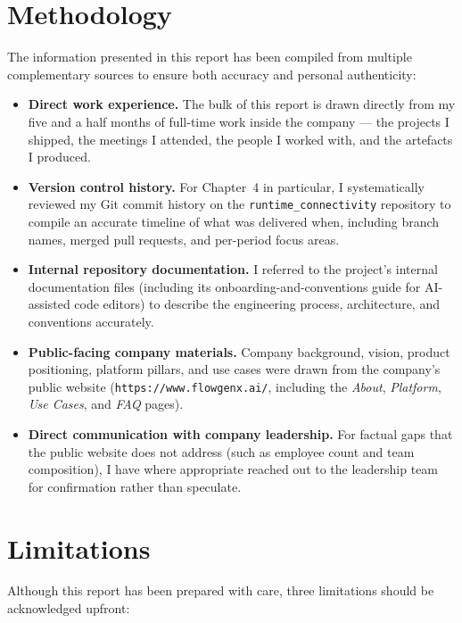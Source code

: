 \section{Methodology}
The information presented in this report has been compiled from
multiple complementary sources to ensure both accuracy and personal
authenticity:

\begin{itemize}[leftmargin=*]
    \item \textbf{Direct work experience.} The bulk of this report is
    drawn directly from my five and a half months of full-time work
    inside the company --- the projects I shipped, the meetings I
    attended, the people I worked with, and the artefacts I produced.

    \item \textbf{Version control history.} For Chapter~4 in particular,
    I systematically reviewed my Git commit history on the
    \texttt{runtime\_connectivity} repository to compile an accurate
    timeline of what was delivered when, including branch names,
    merged pull requests, and per-period focus areas.

    \item \textbf{Internal repository documentation.} I referred to the
    project's internal documentation files (including its
    onboarding-and-conventions guide for
    AI-assisted code editors) to describe the engineering process,
    architecture, and conventions accurately.

    \item \textbf{Public-facing company materials.} Company background,
    vision, product positioning, platform pillars, and use cases were
    drawn from the company's public website
    (\texttt{https://www.flowgenx.ai/}, including the \emph{About},
    \emph{Platform}, \emph{Use Cases}, and \emph{FAQ} pages).

    \item \textbf{Direct communication with company leadership.} For
    factual gaps that the public website does not address (such as
    employee count and team composition), I have where appropriate
    reached out to the leadership team for confirmation rather than
    speculate.
\end{itemize}

\section{Limitations}
Although this report has been prepared with care, three limitations
should be acknowledged upfront:

